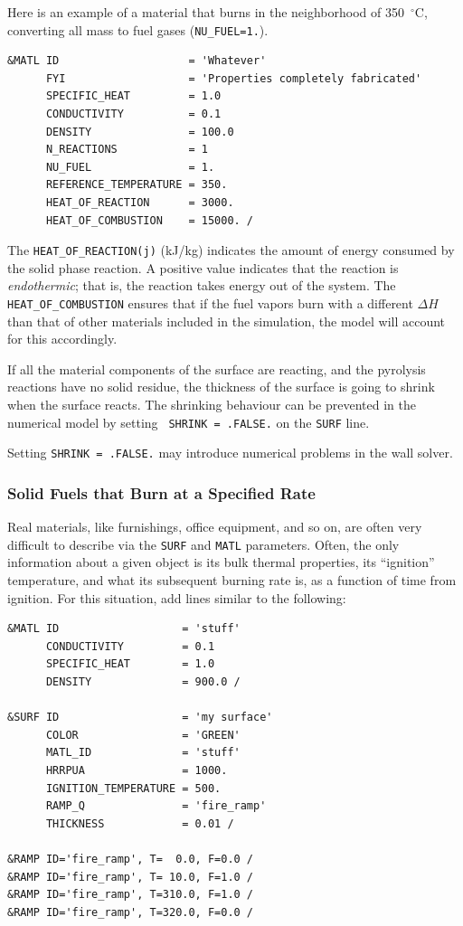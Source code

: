 \documentclass[11pt]{book}
\newcommand{\ct}{\tt\small}
\begin{document}
Here is an example of a material that burns in the neighborhood of 350~$^\circ$C,
converting all mass to fuel gases ({\ct NU\_FUEL=1.}).

\footnotesize
\begin{verbatim}
&MATL ID                    = 'Whatever'
      FYI                   = 'Properties completely fabricated'
      SPECIFIC_HEAT         = 1.0
      CONDUCTIVITY          = 0.1
      DENSITY               = 100.0
      N_REACTIONS           = 1
      NU_FUEL               = 1.
      REFERENCE_TEMPERATURE = 350.
      HEAT_OF_REACTION      = 3000.
      HEAT_OF_COMBUSTION    = 15000. /
\end{verbatim}
\normalsize
\noindent
The {\ct HEAT\_OF\_REACTION(j)} (kJ/kg) indicates the amount of energy
consumed by the solid phase reaction. A positive value indicates that
the reaction is {\em endothermic}; that is, the reaction takes energy
out of the system. The {\ct HEAT\_OF\_COMBUSTION} ensures that if the
fuel vapors burn with a different $\Delta H$ than that of other
materials included in the simulation, the model will account for this
accordingly.

If all the material components of the surface are reacting, and the
pyrolysis reactions have no solid residue, the thickness of the
surface is going to shrink when the surface reacts. The shrinking
behaviour can be prevented in the numerical model by setting {\ct
SHRINK = .FALSE.} on the {\ct SURF} line.
\begin{warning}
\noindent
Setting {\ct SHRINK = .FALSE.} may introduce numerical problems in the
wall solver.
\end{warning}

\subsubsection{Solid Fuels that Burn at a Specified Rate}
Real materials, like furnishings, office equipment, and so on, are
often very difficult to describe via the {\ct SURF} and {\ct MATL}
parameters. Often, the only information about a given object is its
bulk thermal properties, its ``ignition'' temperature, and what its
subsequent burning rate is, as a function of time from ignition. For
this situation, add lines similar to the following:

\footnotesize
\begin{verbatim}
&MATL ID                   = 'stuff'
      CONDUCTIVITY         = 0.1
      SPECIFIC_HEAT        = 1.0
      DENSITY              = 900.0 /

&SURF ID                   = 'my surface'
      COLOR                = 'GREEN'
      MATL_ID              = 'stuff'
      HRRPUA               = 1000.
      IGNITION_TEMPERATURE = 500.
      RAMP_Q               = 'fire_ramp'
      THICKNESS            = 0.01 /

&RAMP ID='fire_ramp', T=  0.0, F=0.0 /
&RAMP ID='fire_ramp', T= 10.0, F=1.0 /
&RAMP ID='fire_ramp', T=310.0, F=1.0 /
&RAMP ID='fire_ramp', T=320.0, F=0.0 /
\end{verbatim} \normalsize
\end{document}

